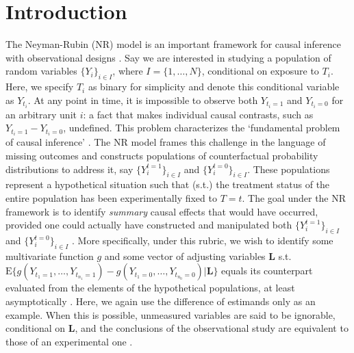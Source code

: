 \documentclass[12pt]{amsart}
\theoremstyle{plain}%
\theoremstyle{definition}
\theoremstyle{remark}
\numberwithin{equation}{section}
\begin{document}
\maketitle
\section{Introduction}
The Neyman-Rubin (NR) model is an important framework for causal inference with observational designs \cite{rubin2019essential, pearl2010causal, holland1986statistics, imbens2015causal}. Say we are interested in studying a population of random variables $\{ Y_i \}_{i \in I}$, where $I = \{1, \ldots, N \}$, conditional on exposure to $T_i$. Here, we specify $T_i$ as binary for simplicity and denote this conditional variable as $Y_{t_i}$. At any point in time, it is impossible to observe both $Y_{t_i=1}$ and $Y_{t_i=0}$ for an arbitrary unit $i$: a fact that makes individual causal contrasts, such as $Y_{t_i=1} - Y_{t_i=0}$, undefined. This problem characterizes the `fundamental problem of causal inference' \cite{ding2018causal}. The NR model frames this challenge in the language of missing outcomes and constructs populations of counterfactual probability distributions to address it, say $\{ Y^{t=1}_i \}_{i \in I}$ and $\{ Y^{t=0}_i \}_{i \in I}$. These populations represent a hypothetical situation such that (s.t.) the treatment status of the entire population has been experimentally fixed to $T=t$. The goal under the NR framework is to identify \textit{summary} causal effects that would have occurred, provided one could actually have constructed and manipulated both $\{ Y^{t=1}_i \}_{i \in I}$ and $\{ Y^{t=0}_i \}_{i \in I}$ \cite{hernan2010causal}. More specifically, under this rubric, we wish to identify some multivariate function $g$ and some vector of adjusting variables $\mathbf{L}$ s.t. $\text{E} \{ g(Y_{t_1=1}, \ldots, Y_{t_{n_1} =1}) - g(Y_{t_1=0}, \ldots, Y_{t_{n_0} =0}) | \mathbf{L} \}$ equals its counterpart evaluated from the elements of the hypothetical populations, at least asymptotically \cite{imbens2010rubin}. Here, we again use the difference of estimands only as an example. When this is possible, unmeasured variables are said to be ignorable, conditional on $\mathbf{L}$, and the conclusions of the observational study are equivalent to those of an experimental one \cite{rosenbaum1983central, holland1987causal}.
\end{document}

